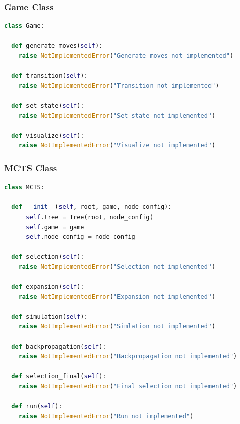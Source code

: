 \documentclass{beamer}
\begin{document}
\begin{frame}[fragile]
  \frametitle{Game Class}

  \begin{lstlisting}[basicstyle=\tiny, showstringspaces=false, language=Python]
  class Game:

  def generate_moves(self):
    raise NotImplementedError("Generate moves not implemented")

  def transition(self):
    raise NotImplementedError("Transition not implemented")

  def set_state(self):
    raise NotImplementedError("Set state not implemented")

  def visualize(self):
    raise NotImplementedError("Visualize not implemented")
  \end{lstlisting}
\end{frame}



\begin{frame}[fragile]
  \frametitle{MCTS Class}

  \begin{lstlisting}[basicstyle=\tiny, showstringspaces=false, language=Python]
  class MCTS:

  def __init__(self, root, game, node_config):
      self.tree = Tree(root, node_config)
      self.game = game
      self.node_config = node_config

  def selection(self):
    raise NotImplementedError("Selection not implemented")

  def expansion(self):
    raise NotImplementedError("Expansion not implemented")

  def simulation(self):
    raise NotImplementedError("Simlation not implemented")

  def backpropagation(self):
    raise NotImplementedError("Backpropagation not implemented")

  def selection_final(self):
    raise NotImplementedError("Final selection not implemented")

  def run(self):
    raise NotImplementedError("Run not implemented")
  \end{lstlisting}
\end{frame}


\end{document}
